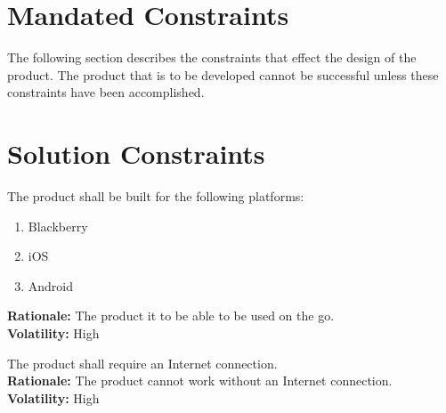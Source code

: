 \newpage
\section{Mandated Constraints}

The following section describes the constraints that effect the design of the
product. The product that is to be developed cannot be successful unless these
constraints have been accomplished.

\section{Solution Constraints}

\noindent\llap{\textbf{[R1/1]}}The product shall be built for the following platforms:\\
\begin{enumerate}
		\item Blackberry
		\item iOS 
		\item Android
\end{enumerate}

\textbf{Rationale:}  The product it to be able to be used on the go.\\
\textbf{Volatility:} High


\noindent\llap{\textbf{[R2/1]}}The product shall require an Internet connection. \\

\textbf{Rationale:}  The product cannot work without an Internet connection.\\
\textbf{Volatility:} High

